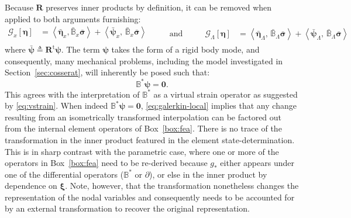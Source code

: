 Because \(\bm{R}\) preserves inner products by definition, it can be
removed when applied to both arguments furnishing: 
\begin{equation}
\begin{aligned}
\mathcal{G}_x\left[\bm{\eta}\right] &=  \left< \bar{\bm{\eta}}_x, \bar{\mathbb{B}}_{x} \bar{\bm{\sigma}} \right> + \left< \bar{\bm{\psi}}_x ,\, \bar{\mathbb{B}}_{x} \bar{\bm{\sigma}}\right> \\
\end{aligned}
\qquad\text{ and }\qquad
\begin{aligned}
\mathcal{G}_{\scriptscriptstyle{\Lambda}}\left[\bm{\eta}\right]&= \left< \bar{\bm{\eta}}_{\scriptscriptstyle{\Lambda}}, \, \bar{\mathbb{B}}_{\scriptscriptstyle{\Lambda}} \bar{\bm{\sigma}} \right> + \left< \bar{\bm{\psi}}_{\scriptscriptstyle{\Lambda}}, \, \bar{\mathbb{B}}_{\scriptscriptstyle{\Lambda}} \bar{\bm{\sigma}}\right>
\end{aligned}
\label{eq:galerkin-local}
\end{equation}
where
\(\bar{\bm{\psi}} \triangleq \bm{R}^{\mathrm{t}}\bm{\psi}\). The term
\(\bm{\psi}\) takes the form of a rigid body mode, and consequently,
many mechanical problems, including the model investigated in
Section~\ref{sec:cosserat}, will inherently be posed such that: %
\begin{equation*} 
\mathbb{B}^*\bm{\psi} = \mathbf{0}.
\end{equation*}
This agrees with the interpretation of \(\mathbb{B}^*\) as a virtual
strain operator as suggested by \eqref{eq:vstrain}.
When indeed \(\mathbb{B}^*\bm{\psi} = \mathbf{0}\), \eqref{eq:galerkin-local} implies %
that any change resulting from an isometrically transformed interpolation can
be factored out from the internal element operators 
of Box~\ref{box:fea}.
There is no trace of the transformation in the inner product featured in the element state-determination.
This is in sharp contrast with the parametric case, where one or more of the
operators in Box~\ref{box:fea} 
need to be re-derived because \(g_*\) either appears
under one of the differential operators (\(\mathbb{B}^*\) or
\(\partial\)), or else in %
the inner product by dependence on \(\bm{\xi}\).
Note, however, that the transformation nonetheless  
changes the representation of the nodal variables and consequently needs to be accounted for by an
external transformation to recover the original representation.

